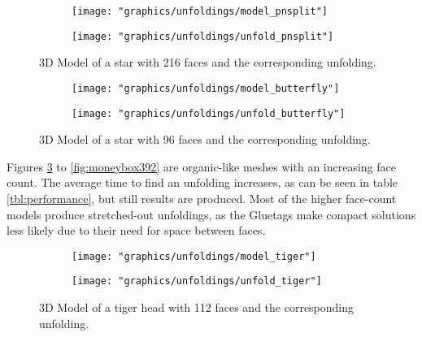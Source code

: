 \documentclass[draft,final]{vutinfth} %
\begin{document}
\begin{figure}
  \begin{subfigure}[b]{0.475\textwidth}
    \texttt{[image: "graphics/unfoldings/model\_pnsplit"]}
  \end{subfigure}
  \begin{subfigure}[b]{0.475\textwidth}
    \texttt{[image: "graphics/unfoldings/unfold\_pnsplit"]}
  \end{subfigure}
  
  \caption{3D Model of a star with 216 faces and the corresponding unfolding.}
  \label{fig:pnsplit}
\end{figure}

\begin{figure}
  \begin{subfigure}[b]{0.475\textwidth}
    \texttt{[image: "graphics/unfoldings/model\_butterfly"]}
  \end{subfigure}
  \begin{subfigure}[b]{0.475\textwidth}
    \texttt{[image: "graphics/unfoldings/unfold\_butterfly"]}
  \end{subfigure}
  
  \caption{3D Model of a star with 96 faces and the corresponding unfolding.}
  \label{fig:butterfly}
\end{figure}

\newpage

Figures \ref{fig:tiger} to \ref{fig:moneybox392} are organic-like meshes with an increasing face count. The average time to find an unfolding increases, as can be seen in table \ref{tbl:performance}, but still results are produced. Most of the higher face-count models produce stretched-out unfoldings, as the Gluetags make compact solutions less likely due to their need for space between faces.

\begin{figure}
  \begin{subfigure}[b]{0.475\textwidth}
    \texttt{[image: "graphics/unfoldings/model\_tiger"]}
  \end{subfigure}
  \begin{subfigure}[b]{0.475\textwidth}
    \texttt{[image: "graphics/unfoldings/unfold\_tiger"]}
  \end{subfigure}
  
  \caption{3D Model of a tiger head with 112 faces and the corresponding unfolding.}
  \label{fig:tiger}
\end{figure}
\end{document}

